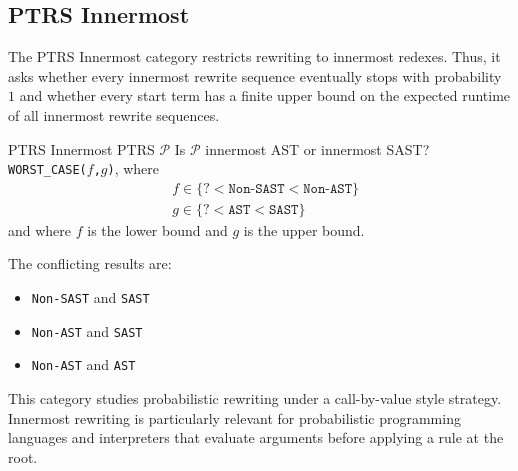 \subsection{PTRS Innermost}

The PTRS Innermost category restricts rewriting to innermost redexes.
Thus, it asks whether every innermost rewrite sequence eventually stops with probability~$1$
and whether every start term has a finite upper bound on the expected runtime of all innermost rewrite sequences.

\begin{formalproblem}
  {PTRS Innermost}
  {PTRS $\mathcal{P}$}
  {Is $\mathcal{P}$ innermost AST or innermost SAST?}
  {\texttt{WORST\_CASE(}$f$\texttt{,}$g$\texttt{)}, where}
  \begin{align*}
    &f \in \{\texttt{?} < \texttt{Non-SAST} < \texttt{Non-AST}\}\\
    &g \in \{\texttt{?} < \texttt{AST} < \texttt{SAST}\}
  \end{align*}
  and where $f$ is the lower bound and $g$ is the upper bound.

  The conflicting results are:
  \begin{itemize}
  \item \texttt{Non-SAST} and \texttt{SAST}
  \item \texttt{Non-AST} and \texttt{SAST}
  \item \texttt{Non-AST} and \texttt{AST}
  \end{itemize}
\end{formalproblem}

\begin{motivation}
This category studies probabilistic rewriting under a call-by-value style strategy.
Innermost rewriting is particularly relevant for probabilistic programming languages and interpreters
that evaluate arguments before applying a rule at the root.
\end{motivation}

